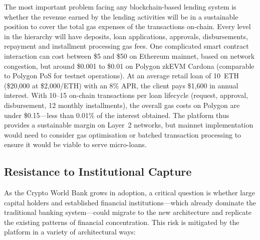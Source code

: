 \documentclass[12pt,a4paper]{report}
\begin{document}
The most important problem facing any blockchain-based lending system is whether the revenue earned by the lending activities will be in a sustainable position to cover the total gas expenses of the transactions on-chain. Every level in the hierarchy will have deposits, loan applications, approvals, disbursements, repayment and installment processing gas fees. One complicated smart contract interaction can cost between \$5 and \$50 on Ethereum mainnet, based on network congestion, but around \$0.001 to \$0.01 on Polygon zkEVM Cardona (comparable to Polygon PoS for testnet operations). At an average retail loan of 10~ETH (\$20,000 at \$2,000/ETH) with an 8\% APR, the client pays \$1,600 in annual interest. With 10--15 on-chain transactions per loan lifecycle (request, approval, disbursement, 12 monthly installments), the overall gas costs on Polygon are under \$0.15---less than 0.01\% of the interest obtained. The platform thus provides a sustainable margin on Layer~2 networks, but mainnet implementation would need to consider gas optimisation or batched transaction processing to ensure it would be viable to serve micro-loans.

\subsection{Resistance to Institutional Capture}

As the Crypto World Bank grows in adoption, a critical question is whether large capital holders and established financial institutions---which already dominate the traditional banking system---could migrate to the new architecture and replicate the existing patterns of financial concentration. This risk is mitigated by the platform in a variety of architectural ways:
\end{document}
